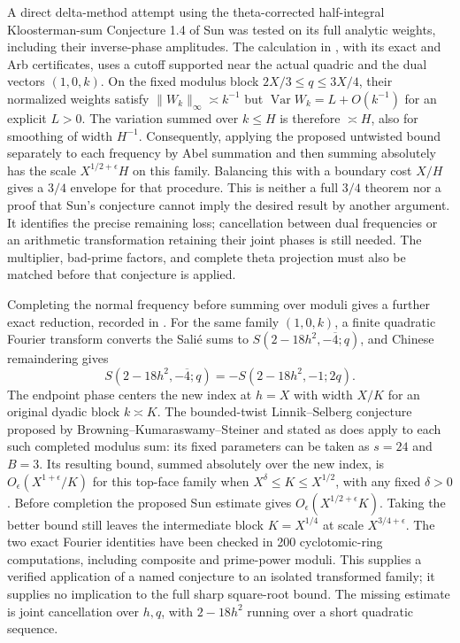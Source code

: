 A direct delta-method attempt using the theta-corrected
half-integral Kloosterman-sum Conjecture 1.4 of
Sun \cite{A5Sun2025} was tested on its full analytic weights,
including their inverse-phase amplitudes.  The calculation in
, with its exact and
Arb certificates, uses a cutoff supported near the actual quadric
and the dual vectors $(1,0,k)$.  On the fixed modulus block
$2X/3\leq q\leq3X/4$, their normalized weights satisfy
$\|W_k\|_\infty\asymp k^{-1}$ but
$\operatorname{Var}W_k=L+O(k^{-1})$ for an explicit $L>0$.
The variation summed over $k\leq H$ is therefore $\asymp H$,
also for smoothing of width $H^{-1}$.
Consequently, applying the proposed untwisted bound separately
to each frequency by Abel summation and then summing absolutely
has the scale $X^{1/2+\epsilon}H$ on this family.
Balancing this with a boundary cost $X/H$ gives a $3/4$
envelope for that procedure.  This is neither a full $3/4$
theorem nor a proof that Sun's conjecture cannot imply the
desired result by another argument.  It identifies the precise
remaining loss; cancellation between dual frequencies or an
arithmetic transformation retaining their joint phases is still
needed.  The multiplier, bad-prime factors, and complete theta
projection must also be matched before that conjecture is applied.

Completing the normal frequency before summing over moduli gives
a further exact reduction, recorded in
.
For the same family $(1,0,k)$, a finite quadratic Fourier
transform converts the Sali\'e sums to
$S(2-18h^2,-\overline4;q)$, and Chinese remaindering gives
\[
 S(2-18h^2,-\overline4;q)
       =-S(2-18h^2,-1;2q).
\]
The endpoint phase centers the new index at $h=X$ with width
$X/K$ for an original dyadic block $k\asymp K$.
The bounded-twist Linnik--Selberg conjecture proposed by
Browning--Kumaraswamy--Steiner and stated as
\cite[Conjecture 2]{A5Steiner2019} does apply to each such
completed modulus sum: its fixed parameters can be taken
as $s=24$ and $B=3$. Its resulting bound, summed absolutely
over the new index, is $O_\epsilon(X^{1+\epsilon}/K)$
for this top-face family when $X^\delta\leq K\leq X^{1/2}$,
with any fixed $\delta>0$. Before completion the proposed
Sun estimate gives $O_\epsilon(X^{1/2+\epsilon}K)$.
Taking the better bound still leaves the intermediate
block $K=X^{1/4}$ at scale $X^{3/4+\epsilon}$.
The two exact Fourier identities have been checked in
200 cyclotomic-ring computations, including composite
and prime-power moduli. This supplies a verified application
of a named conjecture to an isolated transformed family;
it supplies no implication to the full sharp square-root
bound. The missing estimate is joint cancellation over
$h,q$, with $2-18h^2$ running over a short quadratic sequence.

